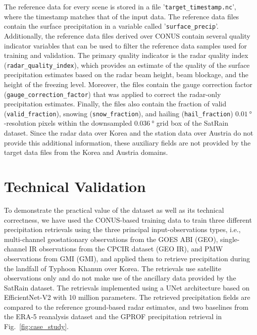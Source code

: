 \documentclass[11pt]{article}
\begin{document}
The reference data for every scene is stored in a file
'\texttt{target\_\textlangle timestamp\textrangle.nc}', where the timestamp
matches that of the input data. The reference data files contain the surface
precipitation in a variable called '\texttt{surface\_precip}'. Additionally, the
reference data files derived over CONUS contain several quality indicator
variables that can be used to filter the reference data samples used for
training and validation. The primary quality indicator is the radar quality
index (\texttt{radar\_quality\_index}), which provides an estimate of the
quality of the surface precipitation estimates based on the radar beam height,
beam blockage, and the height of the freezing level. Moreover, the files contain
the gauge correction factor (\texttt{gauge\_correction\_factor}) that was
applied to correct the radar-only precipitation estimates. Finally, the files
also contain the fraction of valid (\texttt{valid\_fraction}), snowing
(\texttt{snow\_fraction}), and hailing (\texttt{hail\_fraction})
$\SI{0.01}{\degree}$-resolution pixels within the downsampled $\SI{0.036}{\degree}$ grid box of
the SatRain dataset. Since the radar data over Korea and the station data over
Austria do not provide this additional information, these auxiliary fields are
not provided by the target data files from the Korea and Austria domains.


\section{Technical Validation}

To demonstrate the practical value of the dataset as well as its technical
correctness, we have used the CONUS-based training data to train three different
precipitation retrievals using the three principal input-observations types,
i.e., multi-channel geostationary observations from the GOES ABI (GEO),
single-channel IR observations from the CPCIR dataset (GEO IR), and PMW
observations from GMI (GMI), and applied them to retrieve precipitation during
the landfall of Typhoon Khanun over Korea. The retrievals use satellite
observations only and do not make use of the ancillary data provided by the
SatRain dataset. The retrievals implemented using a UNet architecture based on
EfficientNet-V2 with 10 million parameters. The retrieved precipitation fields
are compared to the reference ground-based radar estimates, and two baselines
from the ERA-5 reanalysis dataset and the GPROF precipitation retrieval in Fig.~\ref{fig:case_study}.
\end{document}
